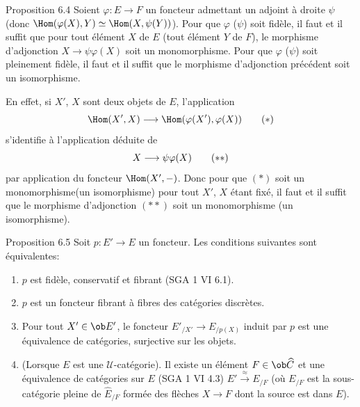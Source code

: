 \begin{enonce*}{Proposition 6.4}
Soient $\varphi:E\rightarrow F$ un foncteur admettant un adjoint à
droite $\psi$ (donc $\Hom(\varphi(X),Y)\simeq \Hom(X,\psi(Y))$).
Pour que $\varphi$ (\resp  $\psi$) soit fidèle, il faut et il suffit
que pour tout élément $X$ de $E$ (\resp  tout élément $Y$ de $F$),
le morphisme d'adjonction $X\rightarrow \psi\varphi(X)$ soit un
monomorphisme. Pour que $\varphi$ (\resp  $\psi$) soit pleinement
fidèle, il faut et il suffit que le morphisme d'adjonction précédent
soit un isomorphisme.
\end{enonce*}
En effet, si $X'$, $X$ sont deux objets de $E$, l'application
\begin{equation*}
\Hom(X',X)\longrightarrow
  \Hom(\varphi(X'),\varphi(X))\tag{$\ast$}
\end{equation*}
s'identifie à l'application déduite de
\begin{equation*}
X\longrightarrow \psi
  \varphi (X)\tag{${\ast}{\ast}$}
\end{equation*}
par application du foncteur $\Hom(X',-)$. Donc pour que $(\ast)$
soit un monomorphisme\pageoriginale (\resp  un isomorphisme) pour
tout $X'$, $X$ étant fixé, il faut et il suffit que le morphisme
d'adjonction $({\ast}{\ast})$ soit un monomorphisme (\resp  un
isomorphisme).

\begin{enonce*}{Proposition 6.5}
Soit $p:E'\rightarrow E$ un foncteur. Les conditions suivantes sont
équivalentes:
\begin{enumerate}
\renewcommand{\theenumi}{\roman{enumi}}
\renewcommand{\labelenumi}{(\theenumi)}
\item $p$ est fidèle, conservatif et fibrant {\rm(SGA 1 VI 6.1).}

\item $p$ est un foncteur fibrant à fibres des catégories
  discrètes.

\item Pour tout $X'\in \ob E'$, le foncteur $E'_{/X'}\rightarrow
  E_{/p(X)}$ induit par $p$ est une équivalence de catégories,
  surjective sur les objets.

\item (Lorsque $E$ est une $𝒰$-catégorie). Il existe un
  élément $F\in \ob\widehat{C}$ et une équivalence de
  catégories sur $E$ {\rm(SGA 1 VI 4.3)} $E'\xrightarrow{\approx}
  E_{/F}$ (où $E_{/F}$ est la sous-catégorie pleine de
  $\widehat{E}_{/F}$ formée des flèches $X\rightarrow F$ dont la
  source est dans $E$).
\end{enumerate}
\end{enonce*}

